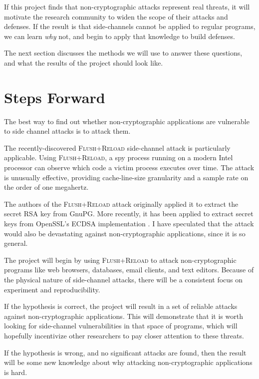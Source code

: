 \documentclass{acm_proc_article-sp}
\begin{document}
If this project finds that non-cryptographic attacks represent real threats, it
will motivate the research community to widen the scope of their attacks and
defenses. If the result is that side-channels cannot be applied to regular
programs, we can learn \emph{why} not, and begin to apply that knowledge to
build defenses.

The next section discusses the methods we will use to answer these questions,
and what the results of the project should look like.

\section{Steps Forward}
\label{sec:stepsforward}

The best way to find out whether non-cryptographic applications are vulnerable
to side channel attacks is to attack them.

The recently-discovered \textsc{Flush+Reload} \cite{yarom2013flush} side-channel
attack is particularly applicable. Using \textsc{Flush+Reload}, a spy process
running on a modern Intel processor can observe which code a victim process
executes over time. The attack is unusually effective, providing cache-line-size
granularity and a sample rate on the order of one megahertz.

The authors of the \textsc{Flush+Reload} attack originally applied it to extract
the secret RSA key from GnuPG. More recently, it has been applied to extract
secret keys from OpenSSL's ECDSA implementation \cite{yarom2014recovering}.
I have speculated \cite{hornby2013flush} that the attack would also be
devastating against non-cryptographic applications, since it is so general.

The project will begin by using \textsc{Flush+Reload} to attack
non-cryptographic programs like web browsers, databases, email clients, and text
editors. Because of the physical nature of side-channel attacks, there will be
a consistent focus on experiment and reproducibility.

If the hypothesis is correct, the project will result in a set of reliable
attacks against non-cryptographic applications. This will demonstrate that it is
worth looking for side-channel vulnerabilities in that space of programs, which
will hopefully incentivize other researchers to pay closer attention to these
threats.

If the hypothesis is wrong, and no significant attacks are found, then the
result will be some new knowledge about why attacking non-cryptographic
applications is hard.
\end{document}
